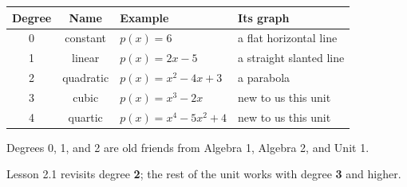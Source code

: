 \documentclass[aspectratio=169, 11pt]{beamer}
\begin{document}
\begin{frame}[t, plain]

  \begin{tabular}{|c|c|l|p{}|}
  \hline
  \textbf{Degree} & \textbf{Name} & \textbf{Example} & \textbf{Its graph} \\
  \hline
  0 & constant  & $p(x) = 6$              & a flat horizontal line \\
  \hline
  1 & linear    & $p(x) = 2x - 5$         & a straight slanted line \\
  \hline
  2 & quadratic & $p(x) = x^2 - 4x + 3$   & a parabola \\
  \hline
  3 & cubic     & $p(x) = x^3 - 2x$       & new to us this unit \\
  \hline
  4 & quartic   & $p(x) = x^4 - 5x^2 + 4$ & new to us this unit \\
  \hline
  \end{tabular}

  \bigskip
  Degrees 0, 1, and 2 are old friends from Algebra 1, Algebra 2, and Unit 1.

  \medskip
  Lesson 2.1 revisits degree \textbf{2}; the rest of the unit works with degree
  \textbf{3} and higher.
\end{frame}
\end{document}
